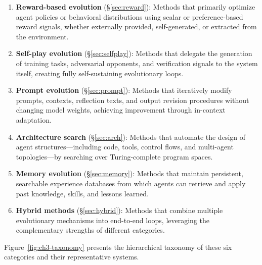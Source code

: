 \begin{enumerate}
\item \textbf{Reward-based evolution} (\S\ref{sec:reward}): Methods that primarily optimize agent policies or behavioral distributions using scalar or preference-based reward signals, whether externally provided, self-generated, or extracted from the environment.

\item \textbf{Self-play evolution} (\S\ref{sec:selfplay}): Methods that delegate the generation of training tasks, adversarial opponents, and verification signals to the system itself, creating fully self-sustaining evolutionary loops.

\item \textbf{Prompt evolution} (\S\ref{sec:prompt}): Methods that iteratively modify prompts, contexts, reflection texts, and output revision procedures without changing model weights, achieving improvement through in-context adaptation.

\item \textbf{Architecture search} (\S\ref{sec:arch}): Methods that automate the design of agent structures---including code, tools, control flows, and multi-agent topologies---by searching over Turing-complete program spaces.

\item \textbf{Memory evolution} (\S\ref{sec:memory}): Methods that maintain persistent, searchable experience databases from which agents can retrieve and apply past knowledge, skills, and lessons learned.

\item \textbf{Hybrid methods} (\S\ref{sec:hybrid}): Methods that combine multiple evolutionary mechanisms into end-to-end loops, leveraging the complementary strengths of different categories.
\end{enumerate}

Figure~\ref{fig:ch3-taxonomy} presents the hierarchical taxonomy of these six categories and their representative systems.

